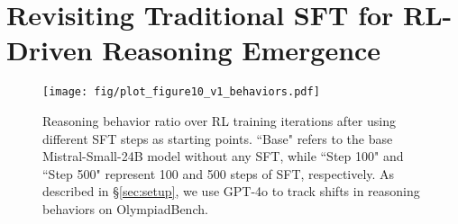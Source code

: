 \documentclass{article} %
\newcommand{\jhc}[2]{\bgroup\textcolor{magenta}{\sout{#1} #2}\egroup}
\begin{document}


\section{Revisiting Traditional SFT for RL-Driven Reasoning Emergence}

\label{sec:short_cot_influence}




\begin{figure}[!t]
        \centering
\texttt{[image: fig/plot\_figure10\_v1\_behaviors.pdf]}\vspace{-10pt}
\caption{Reasoning behavior ratio over RL training iterations after using different SFT steps as starting points. ``Base" refers to the base Mistral-Small-24B model without any SFT, while ``Step 100" and ``Step 500" represent 100 and 500 steps of SFT, respectively. As described in \S\ref{sec:setup}, we use GPT-4o to track shifts in reasoning behaviors on OlympiadBench.}
         \label{fig:sft_behaviur}
\end{figure}
\end{document}
